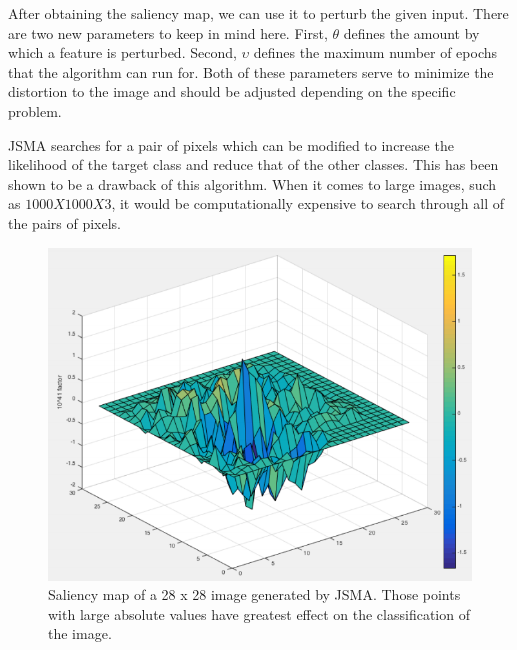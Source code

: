 \documentclass[12pt, conference, letterpaper]{IEEEtran}
\begin{document}
{{{After obtaining the saliency map, we can use it to perturb the given input. There are two new parameters to keep in mind here. First, $\theta$ defines the amount by which a feature is perturbed. Second, $\upsilon$ defines the maximum number of epochs that the algorithm can run for. Both of these parameters serve to minimize the distortion to the image and should be adjusted depending on the specific problem. \newline

JSMA searches for a pair of pixels which can be modified to increase the likelihood of the target class and reduce that of the other classes. This has been shown to be a drawback of this algorithm. When it comes to large images, such as $1000 X 1000 X 3$, it would be computationally expensive to search through all of the pairs of pixels.\cite{8}
\begin{figure}[h]
\includegraphics[scale=0.35]{pictures/saliencymap.png}
\caption{ Saliency map of a 28 x 28 image generated by JSMA. Those points with large absolute values have greatest effect on the classification of the image. \cite{9}}
\end{figure}  \newline

}}}
\end{document}
